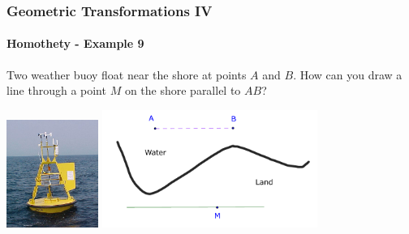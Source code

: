 \documentclass[8pt,xcolor=table,dvipsnames]{beamer}
\begin{document}
\begin{frame}[t]
    \frametitle{Geometric Transformations IV}
    \framesubtitle{Homothety - Example 9}
    \begin{example}
        Two weather buoy float near the shore at points $A$ and $B$.
        How can you draw a line through a point $M$ on the shore parallel to $AB$?
    \end{example}
    \begin{center}
        \includegraphics[width=3cm]{./png/NOAA-NDBC-discus-buoy.jpg}
        \qquad
        \includegraphics[width=7cm]{./svg/pdf/homothety-p9.pdf}
    \end{center}
\end{frame}
\end{document}
